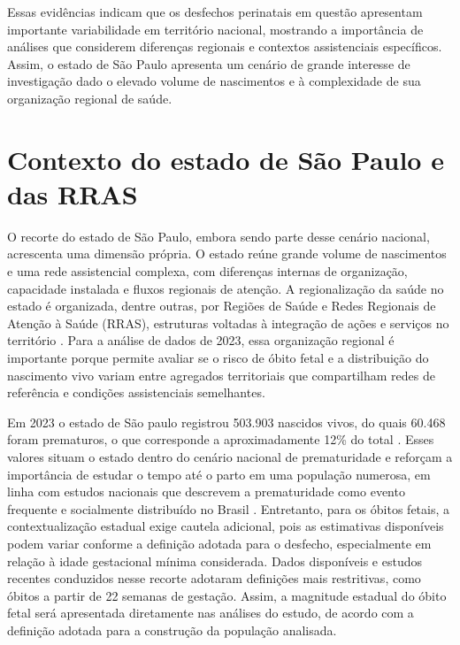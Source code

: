 Essas evidências indicam que os desfechos perinatais em questão apresentam importante 
variabilidade em território nacional, mostrando a importância de análises que considerem 
diferenças regionais e contextos assistenciais específicos. Assim, o estado de São Paulo 
apresenta um cenário de grande interesse de investigação dado o elevado volume de 
nascimentos e à complexidade de sua organização regional de saúde. 

\section{Contexto do estado de São Paulo e das RRAS}

O recorte do estado de São Paulo, embora sendo parte desse cenário nacional,
acrescenta uma dimensão própria. O estado reúne grande volume de nascimentos e 
uma rede assistencial complexa, com diferenças internas de organização, capacidade 
instalada e fluxos regionais de atenção. A regionalização da saúde no estado é 
organizada, dentre outras, por Regiões de Saúde e Redes Regionais de Atenção à 
Saúde (RRAS), estruturas voltadas à integração de ações e serviços no território 
\cite{SESSPRegionalizacao2026}. Para a análise de dados de 2023, essa organização 
regional é importante porque permite avaliar se o risco de óbito fetal e a distribuição 
do nascimento vivo variam entre agregados territoriais que compartilham redes de 
referência e condições assistenciais semelhantes.

Em 2023 o estado de São paulo registrou 503.903 nascidos vivos, do quais 60.468 foram 
prematuros, o que corresponde a aproximadamente 12\% do total \cite{OOBrPainelVigilancia}. 
Esses valores situam o estado dentro do cenário nacional de prematuridade e reforçam 
a importância de estudar o tempo até o parto em uma população numerosa, em linha 
com estudos nacionais que descrevem a prematuridade como evento frequente e 
socialmente distribuído no Brasil \cite{Victor2025PretermBrazil,BrasilBoletimPrematuridade2024}. 
Entretanto, para os óbitos fetais, a contextualização estadual exige cautela adicional, 
pois as estimativas disponíveis podem variar conforme a definição adotada para o 
desfecho, especialmente em relação à idade gestacional mínima considerada. Dados 
disponíveis e estudos recentes conduzidos nesse recorte adotaram definições mais 
restritivas, como óbitos a partir de 22 semanas de gestação. Assim, a magnitude 
estadual do óbito fetal será apresentada diretamente nas análises do estudo, de 
acordo com a definição adotada para a construção da população analisada. 

